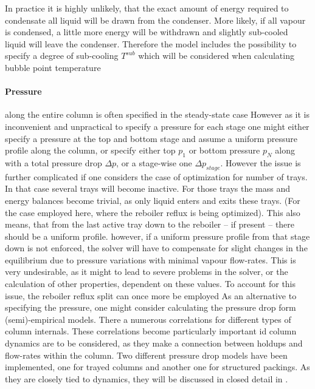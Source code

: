         In practice it is highly unlikely, that the exact amount of energy required to condensate all
        liquid will be drawn from the condenser. More likely, if all vapour is condensed, a little more
        energy will be withdrawn and slightly sub-cooled liquid will leave the condenser. Therefore
        the model includes the possibility to specify a degree of sub-cooling $T^{sub}$ which will be
        considered when calculating bubble point temperature
        \paragraph{Pressure} along the entire column is often specified in the steady-state case
        However as it is inconvenient and unpractical to specify a pressure for each stage one might either specify
        a pressure at the top and bottom stage and assume a uniform pressure profile along the column, or
        specify either top $p_1$ or bottom pressure $p_N$ along with a total pressure drop $\Delta p$,
        or a stage-wise one $\Delta p_{stage}$. However the issue is further complicated if one considers the
        case of optimization for number of trays. In that case several trays will become inactive. For those
        trays the mass and energy balances become trivial, as only liquid enters and exits these trays.
        (For the case employed here, where the reboiler reflux is being optimized). This also means,
        that from the last active tray down to the reboiler -- if present -- there should be a uniform
        profile. however, if a uniform pressure profile from that stage down is not enforced, the solver
        will have to compensate for slight changes in the equilibrium due to pressure variations with minimal
        vapour flow-rates. This is very undesirable, as it might to lead to severe problems in the solver,
        or the calculation of other properties, dependent on these values. To account for this issue, the reboiler
        reflux split can once more be employed
        As an alternative to specifying the pressure, one might consider calculating the pressure drop
        form (semi)-empirical models. There a numerous correlations for different types of column internals.
        These correlations become particularly important id column dynamics are to be considered, as they
        make a connection between holdups and flow-rates within the column. Two different pressure drop models
        have been implemented, one for trayed columns and another one for structured packings. As they are closely
        tied to dynamics, they will be discussed in closed detail in .

